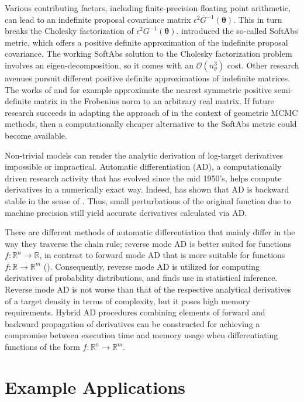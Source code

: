 \documentclass[twoside,11pt]{article}
\begin{document}
Various contributing factors, including finite-precision floating point arithmetic, can lead to an indefinite proposal
covariance matrix $\epsilon^2 G^{-1}(\boldsymbol{\theta})$. This in turn breaks the Cholesky factorization of 
$\epsilon^2 G^{-1}(\boldsymbol{\theta})$. \cite{bet__age} introduced the so-called SoftAbs metric, which offers a 
positive definite approximation of the indefinite proposal covariance. The working SoftAbs solution to the Cholesky 
factorization problem involves an eigen-decomposition, so it comes with an $\mathcal{O}(n_{\theta}^3)$ cost.
Other research avenues pursuit different positive definite approximations of indefinite matrices. The works of 
\cite{hig__com01} and \cite{hig__com02} for example approximate the nearest symmetric positive semi-definite matrix in the 
Frobenius norm to an arbitrary real matrix. If future research succeeds in adapting the approach of \cite{hig__com01} in the 
context of geometric MCMC methods, then a computationally cheaper alternative to the SoftAbs metric could become available.

Non-trivial models can render the analytic derivation of log-target derivatives impossible or impractical. Automatic
differentiation (AD), a computationally driven research activity that has evolved since the mid 1950's, helps compute 
derivatives in a numerically exact way. Indeed, \cite{gri__ona} has shown that AD is backward stable in the sense of 
\cite{wil__mod}. Thus, small perturbations of the original function due to machine precision still yield accurate 
derivatives calculated via AD.

There are different methods of automatic differentiation that mainly differ in the way they traverse the chain rule; reverse 
mode AD is better suited for functions $f:\mathbb{R}^n\rightarrow\mathbb{R}$, in contrast to forward mode AD that is more 
suitable for functions $f:\mathbb{R}\rightarrow\mathbb{R}^m$ (\cite{gri_wal__eva}). Consequently, reverse mode AD is 
utilized for computing derivatives of probability distributions, and finds use in statistical inference. Reverse mode AD is 
not worse than that of the respective analytical derivatives of a target density in terms of complexity, but it poses high
memory requirements. Hybrid AD procedures combining elements of forward and backward propagation of derivatives can be 
constructed for achieving a compromise between execution time and memory usage when differentiating functions of the form
$f:\mathbb{R}^n\rightarrow\mathbb{R}^m$.

\section{Example Applications}
\label{Examples}
\end{document}
